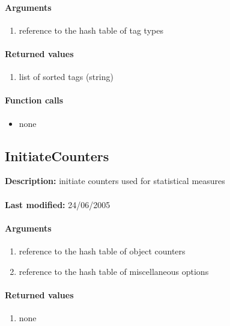\paragraph{Arguments}
\begin{enumerate}
\item reference to the hash table of tag types
\end{enumerate}

\paragraph{Returned values}
\begin{enumerate}
\item list of sorted tags (string)
\end{enumerate}

\paragraph{Function calls}
\begin{itemize}
\item none
\end{itemize}

\subsection{InitiateCounters}
\textbf{Description:} initiate counters used for statistical measures\\
\\\textbf{Last modified:} 24/06/2005

\paragraph{Arguments}
\begin{enumerate}
\item reference to the hash table of object counters
\item reference to the hash table of miscellaneous options
\end{enumerate}

\paragraph{Returned values}
\begin{enumerate}
\item none
\end{enumerate}

